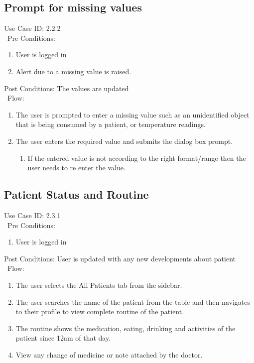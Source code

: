 \subsection{Prompt for missing values} 
Use Case ID: 2.2.2\\\
Pre Conditions: 
\begin{enumerate}
    \item User is logged in
    \item Alert due to a missing value is raised. 
\end{enumerate}
Post Conditions: The values are updated\\\
Flow: 
\begin{enumerate}
    \item The user is prompted to enter a missing value such as an unidentified object that is being consumed by a patient, or temperature readings. 
    \item The user enters the required value and submits the dialog box prompt.
    \begin{enumerate}
        \item If the entered value is not according to the right format/range then the user needs to re enter the value.
    \end{enumerate}
\end{enumerate}
\subsection{Patient Status and Routine} 
Use Case ID: 2.3.1\\\
Pre Conditions: 
\begin{enumerate}
    \item User is logged in
\end{enumerate}
Post Conditions: User is updated with any new developments about patient\\\
Flow:
\begin{enumerate}
    \item The user selects the All Patients tab from the sidebar. 
    \item The user searches the name of the patient from the table and then navigates to their profile to view complete routine of the patient.
    \item The routine shows the medication, eating, drinking and activities of the patient since 12am of that day.
    \item View any change of medicine or note attached by the doctor.
\end{enumerate}
